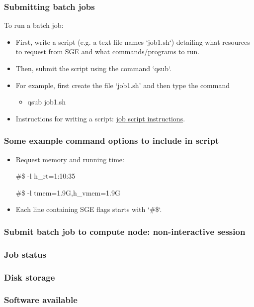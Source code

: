 \documentclass{beamer}
\begin{document}
\begin{frame}[fragile]
\frametitle{Submitting batch jobs}
To run a batch job:
\begin{itemize}
\item First, write a script (e.g.  a text file names `job1.sh`) detailing what resources to request from SGE and what commands/programs to run.
\item Then, submit the script using the command `qsub`.
\item For example, first create the file `job1.sh' and then type the command
\begin{itemize}
\item qsub job1.sh
\end{itemize}
\item Instructions for writing a script: \href{https://www.econ.ucl.ac.uk/wiki/index.php/Non-interactive_sessions}{job script instructions}.
\end{itemize}
\end{frame}

\begin{frame}
\frametitle{Some example command options to include in script}
\begin{itemize}
\item Request memory and running time:
\begin{semiverbatim}
\#\$ -l h\_rt=1:10:35
\end{semiverbatim}
\begin{semiverbatim}
\#\$ -l tmem=1.9G,h\_vmem=1.9G
\end{semiverbatim}
\item Each line containing SGE flags starts with `\#\$`.
\end{itemize}

\end{frame}

\begin{frame}
\frametitle{Submit batch job to compute node: non-interactive session}
\end{frame}

\begin{frame}
\frametitle{Job status}
\end{frame}

\begin{frame}
\frametitle{Disk storage}
\end{frame}

\begin{frame}
\frametitle{Software available}
\end{frame}
\end{document}
